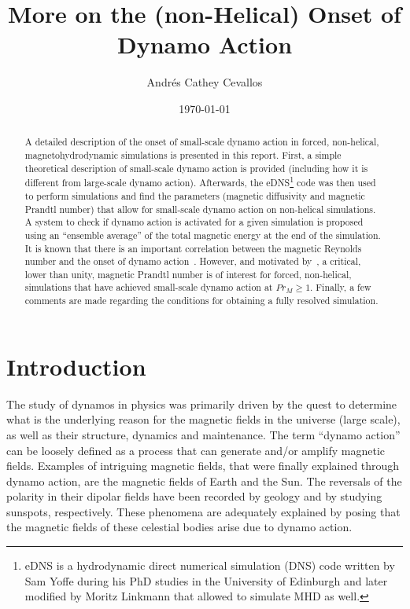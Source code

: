 \documentclass[a4paper,12pt]{article}
\title{More on the (non-Helical) Onset of Dynamo Action}
\author{Andr\'es Cathey Cevallos}
\date{\today}
\begin{document}
\maketitle

\begin{abstract}

 A detailed description of the onset of small-scale dynamo action in forced, non-helical, magnetohydrodynamic simulations is presented in this report. First, a simple theoretical description of small-scale dynamo action is provided (including how it is different from large-scale dynamo action). Afterwards, the eDNS\footnote{eDNS is a hydrodynamic direct numerical simulation (DNS) code written by Sam Yoffe during his PhD studies in the University of Edinburgh and later modified by Moritz Linkmann that allowed to simulate MHD as well.} code was then used to perform simulations and find the parameters (magnetic diffusivity and magnetic Prandtl number) that allow for small-scale dynamo action on non-helical simulations. A system to check if dynamo action is activated for a given simulation is proposed using an ``ensemble average'' of the total magnetic energy at the end of the simulation. It is known that there is an important correlation between the magnetic Reynolds number and the onset of dynamo action~\cite{biskamp1997nonlinear}. However, and motivated by~\cite{schekochihin2004critical}, a critical, lower than unity, magnetic Prandtl number is of interest for forced, non-helical, simulations that have achieved small-scale dynamo action at $Pr_M \geq 1$. Finally, a few comments are made regarding the conditions for obtaining a fully resolved simulation.
\end{abstract}

\section{Introduction}

The study of dynamos in physics was primarily driven by the quest to determine what is the underlying reason for the magnetic fields in the universe (large scale), as well as their structure, dynamics and maintenance. The term ``dynamo action'' can be loosely defined as a process that can generate and/or amplify magnetic fields. Examples of intriguing magnetic fields, that were finally explained through dynamo action, are the magnetic fields of Earth and the Sun. The reversals of the polarity in their dipolar fields have been recorded by geology and by studying sunspots, respectively. These phenomena are adequately explained by posing that the magnetic fields of these celestial bodies arise due to dynamo action. 
\end{document}
